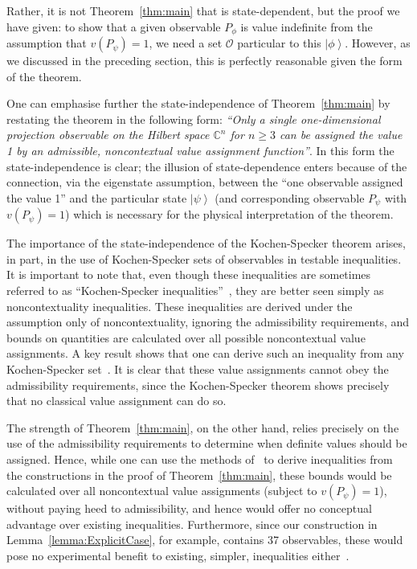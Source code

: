 \documentclass[%
 superscriptaddress,
 preprint,
 showpacs,
 showkeys,
 nofootinbib,
  amsmath,amssymb,
  aps,
  longbibliography,
  floatfix,
 ]{revtex4-1}
\theoremstyle{definition}
\newcommand{\C}{\mathbb{C}}
\newcommand{\ket}[1]{\left| #1 \right>}
\begin{document}
Rather, it is not Theorem~\ref{thm:main} that is state-dependent, but the proof we have given: to show that a given observable $P_\phi$ is value indefinite from the assumption that $v(P_\psi)=1$, we need a set $\mathcal{O}$ particular to this $\ket{\phi}$.
However, as we discussed in the preceding section, this is perfectly reasonable given the form of the theorem.

One can emphasise further the state-independence of Theorem~\ref{thm:main} by restating the theorem in the following form: \emph{``Only a single {\color{blue}one-dimensional projection} observable on the Hilbert space $\C^n$ for $n\ge 3$ can be assigned the value 1 by an admissible, noncontextual value assignment function''}.
In this form the state-independence is clear;
the illusion of state-dependence enters because of the connection, via the eigenstate assumption, between the ``one observable assigned the value 1'' and the particular state $\ket{\psi}$ (and corresponding observable $P_\psi$ with $v(P_\psi)=1$) which is necessary for the physical interpretation of the theorem.


The importance of the state-independence of the Kochen-Specker theorem arises, in part, in the use of Kochen-Specker sets of observables in testable inequalities.
It is important to note that, even though these inequalities are sometimes referred to as ``Kochen-Specker inequalities''~\cite{Larsson:2002aa}, they are better seen simply as noncontextuality inequalities.
These inequalities are derived under the assumption only of noncontextuality, ignoring the admissibility requirements, and bounds on quantities are calculated over all possible noncontextual value assignments.
A key result shows that one can derive such an inequality from any Kochen-Specker set~\cite{Yu:2014aa}.
It is clear that these value assignments cannot obey the admissibility requirements, since the Kochen-Specker theorem shows precisely that no classical value assignment can do so.

The strength of Theorem~\ref{thm:main}, on the other hand, relies precisely on the use of the admissibility requirements to determine when definite values should be assigned.
Hence, while one can use the methods of~\cite{Yu:2014aa} to derive inequalities from the constructions in the proof of Theorem~\ref{thm:main}, these bounds would be calculated over all noncontextual value assignments (subject to $v(P_\psi)=1$), without paying heed to admissibility, and hence would offer no conceptual advantage over existing inequalities.
Furthermore, since our construction in Lemma~\ref{lemma:ExplicitCase}, for example, contains 37 observables, these would pose no experimental benefit to existing, simpler, inequalities either~\cite{Kirchmair:2009gr}.
\end{document}
